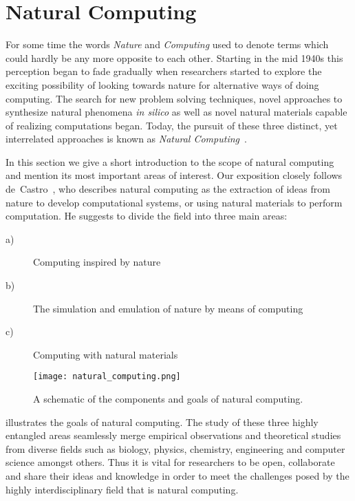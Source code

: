 \section{Natural Computing}\label{sec:natural_computing}

	For some time the words \emph{Nature} and \emph{Computing} used to denote terms which could hardly be any more opposite to each other. Starting in the mid 1940s this perception began to fade gradually when researchers started to explore the exciting possibility of looking towards nature for alternative ways of doing computing. The search for new problem solving techniques, novel approaches to synthesize natural phenomena \emph{in silico} as well as novel natural materials capable of realizing computations began. Today, the pursuit of these three distinct, yet interrelated approaches is known as \emph{Natural Computing}~\cite{de2005natural,de2006fundamentals}.

	In this section we give a short introduction to the scope of natural computing and mention its most important areas of interest. Our exposition closely follows de~Castro~\cite{de2007fundamentals}, who describes natural computing as the extraction of ideas from nature to develop computational systems, or using natural materials to perform computation. He suggests to divide the field into three main areas:

	\begin{description}
		\item[a)] Computing inspired by nature
		\item[b)] The simulation and emulation of nature by means of computing
		\item[c)] Computing with natural materials
	\end{description}

	\begin{figure}
			\centering
			\texttt{[image: natural\_computing.png]}
			\caption[The goals of natural computing.]{A schematic of the components and goals of natural computing.}
			\label{fig:natural_computing}
	\end{figure}

	 illustrates the goals of natural computing. The study of these three highly entangled areas seamlessly merge empirical observations and theoretical studies from diverse fields such as biology, physics, chemistry, engineering and computer science amongst others. Thus it is vital for researchers to be open, collaborate and share their ideas and knowledge in order to meet the challenges posed by the highly interdisciplinary field that is natural computing.

